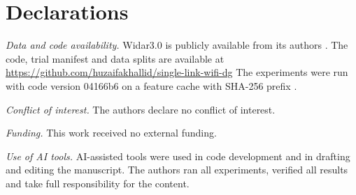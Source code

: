 \documentclass[conference]{IEEEtran}
\begin{document}
\section*{Declarations}
\textit{Data and code availability.} Widar3.0 is publicly available from its authors \cite{zhang2022widar3}. The code, trial manifest and data splits are available at \url{https://github.com/huzaifakhallid/single-link-wifi-dg} The experiments were run with code version 04166b6 on a feature cache with SHA-256 prefix \ShaShort.

\textit{Conflict of interest.} The authors declare no conflict of interest.

\textit{Funding.} This work received no external funding.

\textit{Use of AI tools.} AI-assisted tools were used in code development and in drafting and editing the manuscript. The authors ran all experiments, verified all results and take full responsibility for the content.



\end{document}
